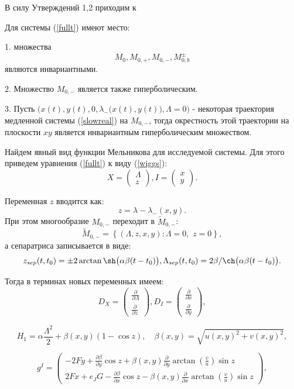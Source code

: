 В силу Утверждений 1,2 приходим к

\begin{utv}
Для системы (\ref{fullt}) имеют место:

1.  множества 
$$M_0, M_{0,+}, M_{0,-}, M_{0,b}^{\pm}$$
являются инвариантными.

2. Множество $M_{0,-}$ является также гиперболическим.

3. Пусть $\Big( x(t), y(t), 0, \lambda_{-} \big( x(t),y(t) \big), \Lambda = 0 \Big)$ - некоторая траектория медленной системы (\ref{slowreal}) на $M_{0,-}$, тогда окрестность этой траектории на плоскости $xy$ является инвариантным гиперболическим множеством.

\end{utv}

Найдем явный вид функции Мельникова для исследуемой системы. Для этого приведем уравнения (\ref{fullt}) к виду (\ref{wiggs}):
$$
 X = \begin{pmatrix}
  \Lambda\\
  z
 \end{pmatrix},
 I = \begin{pmatrix}
  x\\
  y
 \end{pmatrix}.$$

Переменная $z$ вводится как:
$$z = \lambda - \lambda_{-}(x,y).$$ 
При этом многообразие $M_{0,-}$ переходит в $\tilde M_{0,-}$:
$$\tilde M_{0,-} = \left\{ (\Lambda, z, x, y): \Lambda = 0,\,\, z=0 \right\},$$
а сепаратриса записывается в виде:
$$z_{sep}(t,t_0) = \pm 2 \arctan{\sh \big( \alpha \beta (t-t_0) \big)}, \Lambda_{sep}(t,t_0) = 2\beta/ \ch \big(\alpha \beta (t-t_0) \big).$$

Тогда в терминах новых переменных имеем:
$$
 D_X = \begin{pmatrix}
  \frac{\partial}{\partial \Lambda}\\
  \frac{\partial}{\partial z}
 \end{pmatrix},
 D_I = \begin{pmatrix}
  \frac{\partial}{\partial x}\\
  \frac{\partial}{\partial y}
 \end{pmatrix},
 $$

$$H_1 = \alpha \frac{\Lambda^2}{2}+\beta(x,y)(1-\cos z),\quad \beta(x,y) = \sqrt{u(x,y)^2+v(x,y)^2},$$

$$g^I = \begin{pmatrix}
  -2Fy+\frac{\partial \beta}{\partial y} \cos z + \beta(x,y) \frac{\partial}{\partial y} \arctan(\frac{v}{u}) \sin z\\
  2Fx +e_JG -\frac{\partial \beta}{\partial x} \cos z - \beta(x,y) \frac{\partial}{\partial x} \arctan(\frac{v}{u}) \sin z
 \end{pmatrix},$$

